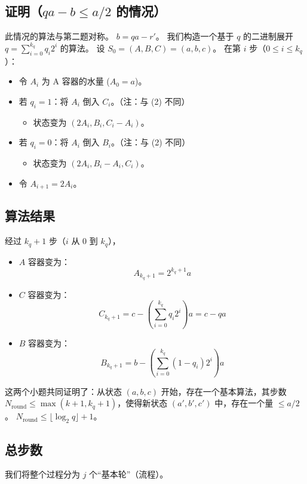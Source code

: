 \documentclass{ctexart}
\begin{document}
\subsection{证明（$qa-b \le a/2$ 的情况）}
此情况的算法与第二题对称。 $b = qa - r'$。
我们构造一个基于 $q$ 的二进制展开 $q = \sum_{i=0}^{k_q} q_i 2^i$ 的算法。
设 $S_0 = (A, B, C) = (a, b, c)$。
在第 $i$ 步（$0 \le i \le k_q$）：
\begin{itemize}
    \item 令 $A_i$ 为 A 容器的水量 ($A_0 = a$)。
    \item 若 $q_i = 1$：将 $A_i$ 倒入 $C_i$。（注：与 (2) 不同）
    \begin{itemize}
        \item 状态变为 $(2A_i, B_i, C_i-A_i)$。
    \end{itemize}
    \item 若 $q_i = 0$：将 $A_i$ 倒入 $B_i$。（注：与 (2) 不同）
    \begin{itemize}
        \item 状态变为 $(2A_i, B_i-A_i, C_i)$。
    \end{itemize}
    \item 令 $A_{i+1} = 2A_i$。
\end{itemize}

\subsection*{算法结果}
经过 $k_q+1$ 步（$i$ 从 0 到 $k_q$），
\begin{itemize}
    \item $A$ 容器变为：
    $$ A_{k_q+1} = 2^{k_q+1}a $$

    \item $C$ 容器变为：
    $$ C_{k_q+1} = c - \left( \sum_{i=0}^{k_q} q_i 2^i \right) a = c - qa $$

    \item $B$ 容器变为：
    $$ B_{k_q+1} = b - \left( \sum_{i=0}^{k_q} (1-q_i) 2^i \right) a $$
\end{itemize}

这两个小题共同证明了：从状态 $(a, b, c)$ 开始，存在一个基本算法，其步数 $N_{\text{round}} \le \max(k+1, k_q+1)$，使得新状态 $(a', b', c')$ 中，存在一个量 $\le a/2$。
$N_{\text{round}} \le \lfloor \log_2 q \rfloor + 1$。

\subsection{总步数}
我们将整个过程分为 $j$ 个“基本轮”（流程）。
\end{document}
